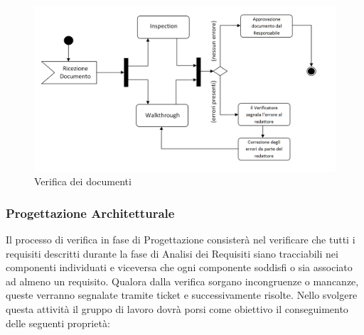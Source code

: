 \begin{figure}[h!]
	\centering
	\includegraphics[scale=.45]{img/schema_RR.png}
	\caption{Verifica dei documenti}
\end{figure}

\subsubsection{Progettazione Architetturale}
Il processo di verifica in fase di Progettazione consisterà nel verificare che tutti i requisiti descritti durante la fase di Analisi dei Requisiti siano tracciabili nei componenti individuati e viceversa che ogni componente soddisfi o sia associato ad almeno un requisito. Qualora dalla verifica sorgano incongruenze o mancanze, queste verranno segnalate tramite ticket e successivamente risolte. Nello svolgere questa attività il gruppo di lavoro dovrà porsi come obiettivo il conseguimento delle seguenti proprietà:

